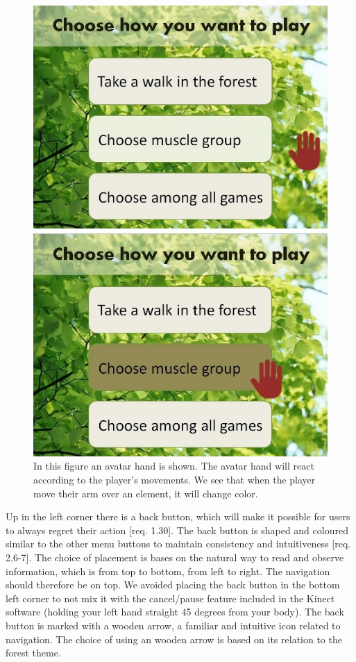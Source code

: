 \begin{figure} [H]
\centering
\includegraphics[scale=0.5]{menuAction.jpg}
\caption[Menu - Action and response]{In this figure an avatar hand is shown. The avatar hand will react according to the player's movements. We see that when the player move their arm over an element, it will change color.}
\label{fig:avatarAction}
\end{figure} 

Up in the left corner there is a back button, which will make it possible for users to always regret their action [req. 1.30]. The back button is shaped and coloured similar to the other menu buttons to maintain consistency and intuitiveness [req. 2.6-7]. The choice of placement is bases on the natural way to read and observe information, which is from top to bottom, from left to right. The navigation should therefore be on top. We avoided placing the back button in the bottom left corner to not mix it with the cancel/pause feature included in the Kinect software (holding your left hand straight 45 degrees from your body). The back button is marked with a wooden arrow, a familiar and intuitive icon related to navigation. The choice of using an wooden arrow is based on its relation to the forest theme. 

